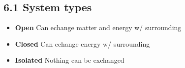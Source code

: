 \subsection{6.1 System types}
    \begin{itemize}
        \item \textbf{Open} Can echange matter and energy w/ surrounding
        \item \textbf{Closed} Can echange energy w/ surrounding
        \item \textbf{Isolated} Nothing can be exchanged
    \end{itemize}